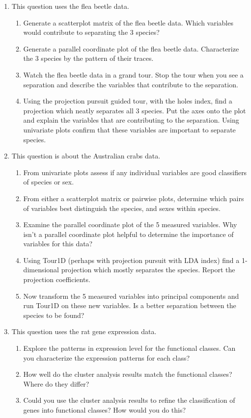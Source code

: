 \documentclass{article}
\begin{document}
\begin{enumerate}
\item
This question uses the flea beetle data. 
\begin{enumerate} 
\item
Generate a scatterplot matrix of the flea beetle data. Which variables
would contribute to separating the 3 species?
\item
Generate a parallel coordinate plot of the flea beetle data. Characterize 
the 3 species by the pattern of their traces.
\item
Watch the flea beetle data in a grand tour. Stop the tour when you see a 
separation and describe the variables that contribute to the separation.
\item
Using the projection pursuit guided tour, with the holes index, find a
projection which neatly separates all 3 species. Put the axes onto the
plot and explain the variables that are contributing to the
separation. Using univariate plots confirm that these variables are
important to separate species. 
\end{enumerate}
\item This question is about the Australian crabs data.
\begin{enumerate}
\item
From univariate plots assess if any individual variables are good
classifiers of species or sex.
\item From either a scatterplot matrix or pairwise plots, determine 
which pairs of variables best distinguish the species, and sexes
within species.
\item Examine the parallel coordinate plot of the 5 measured variables. 
Why isn't a parallel coordinate plot helpful to determine the 
importance of variables for this data?
\item Using Tour1D (perhaps with projection pursuit with LDA index) 
find a 1-dimensional projection which mostly separates the 
species. Report the projection coefficients.
\item Now transform the 5 measured variables into principal components 
and run Tour1D on these new variables. Is a better separation between
the species to be found?
\end{enumerate}
\item This question uses the rat gene expression data.
\begin{enumerate}
\item Explore the patterns in expression level for the functional
classes. Can you characterize the expression patterns for each class?
\item How well do the cluster analysis results match the functional
classes? Where do they differ? 
\item Could you use the cluster analysis results to refine the
classification of genes into functional classes? How would you do
this?
\end{enumerate}
\end{enumerate}
\end{document}
